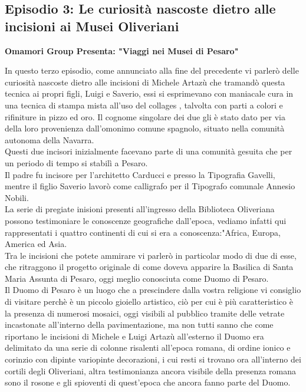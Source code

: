 \documentclass[hidelinks,12pt,a4paper]{article}
\begin{document}
\begin{flushleft}
		\subsection{Episodio 3: Le curiosità nascoste dietro alle incisioni ai Musei Oliveriani}
		\begin{center}
			\textbf{Omamori Group Presenta: "Viaggi nei Musei di Pesaro"}
		\end{center}
		In questo terzo episodio, come annunciato alla fine del precedente vi parlerò delle curiosità nascoste dietro alle incisioni di Michele Artazù che tramandò questa tecnica ai propri figli, Luigi e Saverio, essi si esprimevano con maniacale cura in una tecnica di stampa mista all'uso del collages , talvolta con parti a colori e rifiniture in pizzo ed oro. Il cognome singolare dei due gli è stato dato per via della loro provenienza dall'omonimo comune spagnolo, situato nella comunità autonoma della Navarra.\\
		Questi due incisori inizialmente facevano parte di una comunità gesuita che per un periodo  di tempo si stabilì a Pesaro.\\
		Il padre fu incisore per l'architetto Carducci e presso la Tipografia Gavelli, mentre il figlio Saverio lavorò come calligrafo per il Tipografo comunale Annesio Nobili.\\
		La serie di pregiate inisioni presenti all'ingresso della Biblioteca Oliveriana possono testimoniare le conoscenze geografiche dall'epoca, vediamo infatti qui rappresentati i quattro continenti di cui si era a conoscenza:"Africa, Europa, America ed Asia.\\
		Tra le incisioni che potete ammirare vi parlerò in particolar modo di due di esse, che ritraggono il progetto originale di come doveva apparire la Basilica di Santa Maria Assunta di Pesaro, oggi meglio conosciuta come Duomo di Pesaro.\\
		Il Duomo di Pesaro è un luogo che a prescindere dalla vostra religione vi consiglio di visitare perchè è un piccolo gioiello artistico, ciò per cui è più caratteristico è la presenza di numerosi mosaici, oggi visibili al pubblico tramite delle vetrate incastonate all'interno della pavimentazione, ma non tutti sanno che come riportano le incisioni di Michele e Luigi Artazù all'esterno il Duomo era delimitato da una serie di colonne risalenti all'epoca romana, di ordine ionico e corinzio con dipinte variopinte decorazioni, i cui resti si trovano ora all'interno dei cortili degli Oliveriani, altra testimonianza ancora visibile  della presenza romana sono il rosone e gli spioventi di quest'epoca che ancora fanno parte del Duomo.\\

\end{flushleft}
\end{document}

